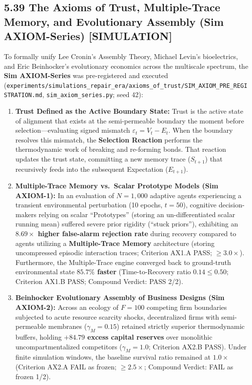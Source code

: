 \documentclass[
]{article}
\providecommand{\tightlist}{%
  \setlength{\itemsep}{0pt}\setlength{\parskip}{0pt}}
\begin{document}
\subsection{5.39 The Axioms of Trust, Multiple-Trace Memory, and
Evolutionary Assembly (Sim AXIOM-Series)
{[}SIMULATION{]}}\label{the-axioms-of-trust-multiple-trace-memory-and-evolutionary-assembly-sim-axiom-series-simulation}

To formally unify Lee Cronin's Assembly Theory, Michael Levin's
bioelectrics, and Eric Beinhocker's evolutionary economics across the
multiscale spectrum, the \textbf{Sim AXIOM-Series} was pre-registered
and executed
(\texttt{experiments/simulations\_repair\_era/axioms\_of\_trust/SIM\_AXIOM\_PRE\_REGISTRATION.md},
\texttt{sim\_axiom\_series.py}; seed 42):

\begin{enumerate}
\def\labelenumi{\arabic{enumi}.}
\tightlist
\item
  \textbf{Trust Defined as the Active Boundary State:} Trust is the
  active state of alignment that exists at the semi-permeable boundary
  the moment before selection---evaluating signed mismatch
  \(\varepsilon_t = V_t - E_t\). When the boundary resolves this
  mismatch, the \textbf{Selection Reaction} performs the thermodynamic
  work of breaking and re-forming bonds. That reaction updates the trust
  state, committing a new memory trace (\(S_{t+1}\)) that recursively
  feeds into the subsequent Expectation (\(E_{t+1}\)).
\item
  \textbf{Multiple-Trace Memory vs.~Scalar Prototype Models (Sim
  AXIOM-1):} In an evaluation of \(N = 1,000\) adaptive agents
  experiencing a transient environmental perturbation (10 epochs,
  \(t=50\)), cognitive decision-makers relying on scalar ``Prototypes''
  (storing an un-differentiated scalar running mean) suffered severe
  prior rigidity (``stuck priors''), exhibiting an
  \textbf{\(8.69\times\) higher false-alarm rejection rate} during
  recovery compared to agents utilizing a \textbf{Multiple-Trace Memory}
  architecture (storing uncompressed episodic interaction traces;
  Criterion AX1.A PASS; \(\ge 3.0\times\)). Furthermore, the
  Multiple-Trace engine converged back to ground-truth environmental
  state \textbf{\(85.7\%\) faster} (Time-to-Recovery ratio
  \(0.14 \le 0.50\); Criterion AX1.B PASS; Compound Verdict: PASS 2/2).
\item
  \textbf{Beinhocker Evolutionary Assembly of Business Designs (Sim
  AXIOM-2):} Across an ecology of \(F = 100\) competing firm boundaries
  subjected to acute resource scarcity shocks, decentralized firms with
  semi-permeable membranes (\(\gamma_M = 0.15\)) retained strictly
  superior thermodynamic buffers, holding \textbf{\(+84.79\) excess
  capital reserves} over monolithic uncompartmentalized competitors
  (\(\gamma_M = 1.0\); Criterion AX2.B PASS). Under finite simulation
  windows, the baseline survival ratio remained at \(1.0\times\)
  (Criterion AX2.A FAIL as frozen; \(\ge 2.5\times\); Compound Verdict:
  FAIL as frozen 1/2).
\end{enumerate}
\end{document}
